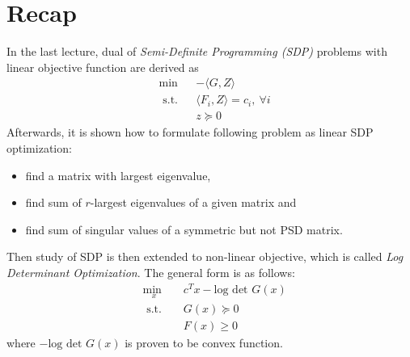 \documentclass[12pt]{report}
\begin{document}

\maketitle


\section{Recap}
In the last lecture, dual of {\it Semi-Definite Programming (SDP)} problems with linear
objective function are derived as 
\begin{equation}
\begin{aligned}
    &\underset{}{\text{min}} && - \langle G, Z \rangle  \\
    &\text{ s.t.} && \langle F_i, Z \rangle = c_i,\ \forall i  \\
       & && z \succeq 0
\end{aligned}
\end{equation}
Afterwards, it is shown how to formulate following problem as linear SDP
optimization:
\begin{itemize}
    \item find a matrix with largest eigenvalue, 
    \item find sum of $r$-largest eigenvalues of a given matrix and
    \item find sum of singular values of a symmetric but not PSD matrix.
\end{itemize}
Then study of SDP is then extended to non-linear objective, which is called
{\it Log Determinant Optimization}. The general form is as follows:
\begin{equation}
\begin{aligned}
    &\underset{x}{\text{min }} && c^T x - \text{log det } G(x) \\
    &\text{ s.t.} && G(x) \succeq 0 \\
    & && F(x) \geq 0
\end{aligned}
\end{equation}
where $- \text{log det } G(x)$ is proven to be convex function. \\
\end{document}
